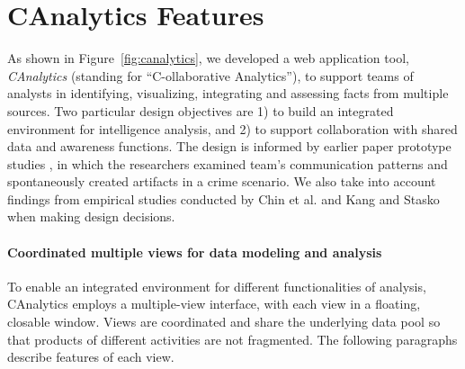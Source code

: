 \section{CAnalytics Features}\label{canalytics-features}



As shown in Figure~\ref{fig:canalytics}, we developed a web application tool, \emph{CAnalytics} (standing for ``C-ollaborative Analytics''), to
support teams of analysts in identifying, visualizing, integrating and
assessing facts from multiple sources. Two particular design objectives are 1) to build an integrated environment for intelligence analysis, and 2) to support collaboration with shared data and awareness functions. The design is informed by earlier
paper prototype studies \cite{Borge2012, Carroll2013}, in which the researchers examined team's communication patterns and
spontaneously created artifacts in a crime scenario. We also take into account findings from
empirical studies conducted by Chin et al. \cite{Chin2009} and Kang
and Stasko \cite{Kang2011} when making design decisions.

\paragraph{Coordinated multiple views for data modeling and analysis}

To enable an integrated environment for different functionalities of analysis, CAnalytics employs a multiple-view interface, with each view in a floating, closable window. Views are coordinated and share the underlying data pool so that products of different activities are not fragmented. The following paragraphs describe features of each view.

